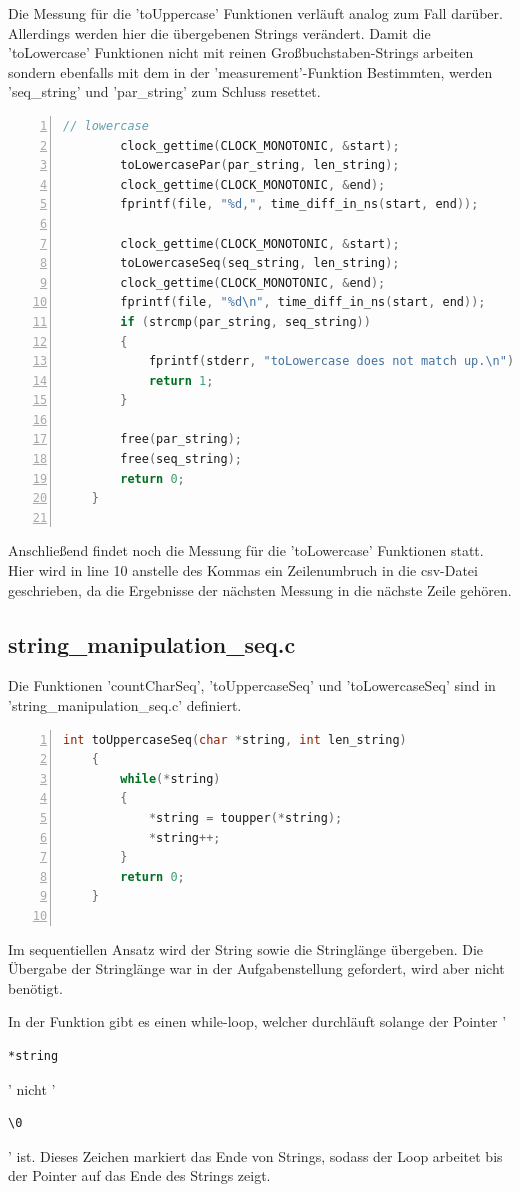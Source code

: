 \documentclass[plainarticle,zihtitle,german,final,hyperref,utf8]{zihpub}
\begin{document}
Die Messung für die 'toUppercase' Funktionen verläuft analog zum Fall darüber. Allerdings werden hier die übergebenen Strings verändert. Damit die 'toLowercase' Funktionen nicht mit reinen Großbuchstaben-Strings arbeiten sondern ebenfalls mit dem in der 'measurement'-Funktion Bestimmten, werden 'seq\_string' und 'par\_string' zum Schluss  resettet.

\begin{lstlisting}[language=c, numbers=left]		
		// lowercase
		clock_gettime(CLOCK_MONOTONIC, &start);	
		toLowercasePar(par_string, len_string);
		clock_gettime(CLOCK_MONOTONIC, &end);
		fprintf(file, "%d,", time_diff_in_ns(start, end));	
		
		clock_gettime(CLOCK_MONOTONIC, &start);	
		toLowercaseSeq(seq_string, len_string);
		clock_gettime(CLOCK_MONOTONIC, &end);
		fprintf(file, "%d\n", time_diff_in_ns(start, end));	
		if (strcmp(par_string, seq_string))
		{
			fprintf(stderr, "toLowercase does not match up.\n");
			return 1;
		}
		
		free(par_string);
		free(seq_string);
		return 0;
	}
	
\end{lstlisting}

Anschließend findet noch die Messung für die 'toLowercase' Funktionen statt.
Hier wird in line 10 anstelle des Kommas ein Zeilenumbruch in die csv-Datei geschrieben, da die Ergebnisse der nächsten Messung in die nächste Zeile gehören.


\subsection{string\_manipulation\_seq.c}
Die Funktionen 'countCharSeq', 'toUppercaseSeq' und 'toLowercaseSeq' sind in 'string\_manipulation\_seq.c' definiert.

\begin{lstlisting}[language=c, numbers=left]
	int toUppercaseSeq(char *string, int len_string)
	{
		while(*string)
		{
			*string = toupper(*string);
			*string++;
		}
		return 0;
	}
	
\end{lstlisting}

Im sequentiellen Ansatz wird der String sowie die Stringlänge übergeben. Die Übergabe der Stringlänge war in der Aufgabenstellung gefordert, wird aber nicht benötigt.

In der Funktion gibt es einen while-loop, welcher durchläuft solange der Pointer 
 '\begin{verbatim}*string\end{verbatim}' nicht '\begin{verbatim}\0\end{verbatim}' ist. Dieses Zeichen markiert das Ende von Strings, sodass der Loop arbeitet bis der Pointer auf das Ende des Strings zeigt.
\end{document}
